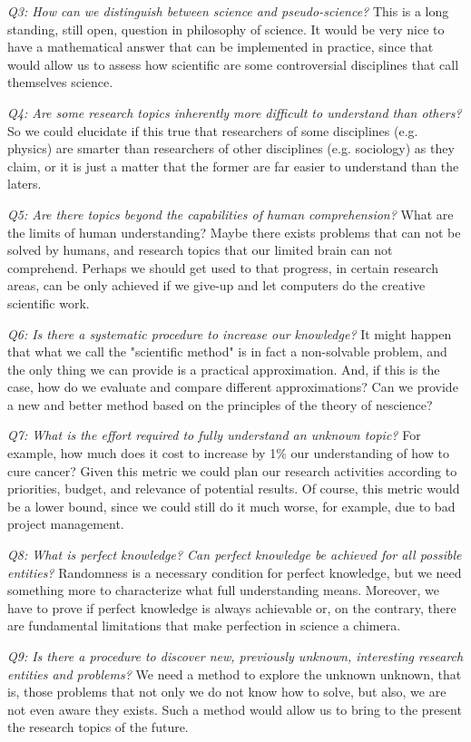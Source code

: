 \emph{Q3: How can we distinguish between science and pseudo-science?} This is a long standing, still open, question in philosophy of science. It would be very nice to have a mathematical answer that can be implemented in practice, since that would allow us to assess how scientific are some controversial disciplines that call themselves science.

\emph{Q4: Are some research topics inherently more difficult to understand than others?} So we could elucidate if this true that researchers of some disciplines (e.g. physics) are smarter than researchers of other disciplines (e.g. sociology) as they claim, or it is just a matter that the former are far easier to understand than the laters.

\emph{Q5: Are there topics beyond the capabilities of human comprehension?} What are the limits of human understanding? Maybe there exists problems that can not be solved by humans, and research topics that our limited brain can not comprehend. Perhaps we should get used to that progress, in certain research areas, can be only achieved if we give-up and let computers do the creative scientific work.

\emph{Q6: Is there a systematic procedure to increase our knowledge?} It might happen that what we call the "scientific method" is in fact a non-solvable problem, and the only thing we can provide is a practical approximation. And, if this is the case, how do we evaluate and compare different approximations? Can we provide a new and better method based on the principles of the theory of nescience?

\emph{Q7: What is the effort required to fully understand an unknown topic?} For example, how much does it cost to increase by 1\% our understanding of how to cure cancer? Given this  metric we could plan our research activities according to priorities, budget, and relevance of potential results. Of course, this metric would be a lower bound, since we could still do it much worse, for example, due to bad project management.

\emph{Q8: What is perfect knowledge? Can perfect knowledge be achieved for all possible entities?} Randomness is a necessary condition for perfect knowledge, but we need something more to characterize what full understanding means. Moreover, we have to prove if perfect knowledge is always achievable or, on the contrary, there are fundamental limitations that make perfection in science a chimera. 

\emph{Q9: Is there a procedure to discover new, previously unknown, interesting research entities and problems?} We need a method to explore the unknown unknown, that is, those problems that not only we do not know how to solve, but also, we are not even aware they exists. Such a method would allow us to bring to the present the research topics of the future.

